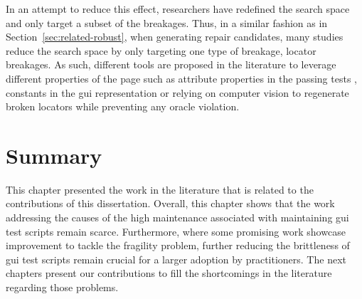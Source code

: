 In an attempt to reduce this effect, researchers have redefined the search space and only target a subset of the breakages. Thus, in a similar fashion as in Section~\ref{sec:related-robust}, when generating repair candidates, many studies reduce the search space by only targeting one type of breakage, locator breakages. As such, different tools are proposed in the literature to leverage different properties of the page such as attribute properties in the passing tests \cite{Choudhary2011}, constants in the \gls{gui} representation \cite{Eladawy2018, Kirinuki2019} or relying on computer vision\cite{Stocco2018} to regenerate broken locators while preventing any oracle violation.

\section{Summary}
\label{sec:related-summary}

This chapter presented the work in the literature that is related to the contributions of this dissertation. Overall, this chapter shows that the work addressing the causes of the high maintenance associated with maintaining \gls{gui} test scripts remain scarce. Furthermore, where some promising work showcase improvement to tackle the fragility problem, further reducing the brittleness of \gls{gui} test scripts remain crucial for a larger adoption by practitioners. The next chapters present our contributions to fill the shortcomings in the literature regarding those problems.